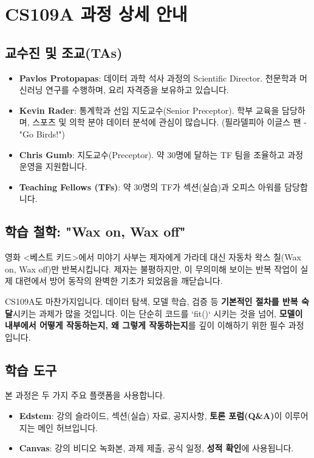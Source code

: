 \documentclass[11pt,a4paper]{book}
\theoremstyle{definition}
\begin{document}
\section{CS109A 과정 상세 안내}

\subsection{교수진 및 조교(TAs)}
\begin{itemize}
    \item \textbf{Pavlos Protopapas}: 데이터 과학 석사 과정의 Scientific Director. 천문학과 머신러닝 연구를 수행하며, 요리 자격증을 보유하고 있습니다.
    \item \textbf{Kevin Rader}: 통계학과 선임 지도교수(Senior Preceptor). 학부 교육을 담당하며, 스포츠 및 의학 분야 데이터 분석에 관심이 많습니다. (필라델피아 이글스 팬 - "Go Birds!")
    \item \textbf{Chris Gumb}: 지도교수(Preceptor). 약 30명에 달하는 TF 팀을 조율하고 과정 운영을 지원합니다.
    \item \textbf{Teaching Fellows (TFs)}: 약 30명의 TF가 섹션(실습)과 오피스 아워를 담당합니다.
\end{itemize}

\subsection{학습 철학: "Wax on, Wax off"}
\begin{examplebox}
영화 <베스트 키드>에서 미야기 사부는 제자에게 가라데 대신 자동차 왁스 칠(Wax on, Wax off)만 반복시킵니다. 제자는 불평하지만, 이 무의미해 보이는 반복 작업이 실제 대련에서 방어 동작의 완벽한 기초가 되었음을 깨닫습니다.

CS109A도 마찬가지입니다.
데이터 탐색, 모델 학습, 검증 등 \textbf{기본적인 절차를 반복 숙달}시키는 과제가 많을 것입니다. 이는 단순히 코드를 `fit()` 시키는 것을 넘어, \textbf{모델이 내부에서 어떻게 작동하는지, 왜 그렇게 작동하는지}를 깊이 이해하기 위한 필수 과정입니다.
\end{examplebox}

\subsection{학습 도구}
본 과정은 두 가지 주요 플랫폼을 사용합니다.
\begin{itemize}
    \item \textbf{Edstem}: 강의 슬라이드, 섹션(실습) 자료, 공지사항, \textbf{토론 포럼(Q\&A)}이 이루어지는 메인 허브입니다.
    \item \textbf{Canvas}: 강의 비디오 녹화본, 과제 제출, 공식 일정, \textbf{성적 확인}에 사용됩니다.
\end{itemize}
\end{document}
